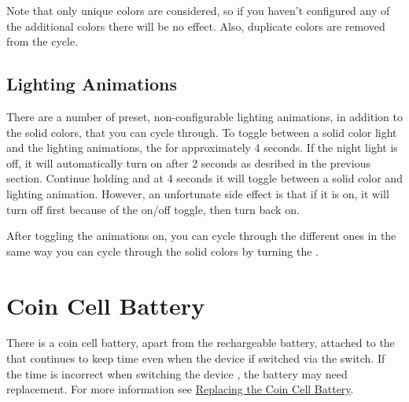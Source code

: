 Note that only unique colors are considered, so if you haven't
configured any of the additional colors there will be no effect.  Also,
duplicate colors are removed from the cycle.


\subsection{Lighting Animations}

There are a number of preset, non-configurable lighting animations, in addition
to the solid colors, that you can cycle through.  To toggle between a solid
color light and the lighting animations,  the  for approximately
\num{4} seconds. If the night light is off, it will automatically turn on after
\num{2} seconds as desribed in the previous section.  Continue holding and at
\num{4} seconds it will toggle between a solid color and lighting animation.
However, an unfortunate side effect is that if it is on, it will turn off first
because of the on/off toggle, then turn back on.


After toggling the animations on, you can cycle through the different ones in
the same way you can cycle through the solid colors by turning the .

\section{Coin Cell Battery}

There is a  coin cell battery, apart from the rechargeable
battery, attached to the  that continues to keep time even when the
device if switched  via the  switch.  If the time is incorrect
when switching the device , the battery may need replacement.  For more
information see \hyperref[Replacing Battery]{Replacing the Coin Cell Battery}.

